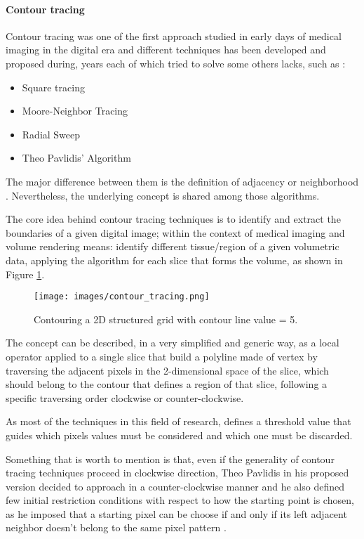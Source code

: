 \documentclass[12pt,a4paper]{extarticle}
\newcommand{\linespace}{\vspace{8pt}}
\begin{document}
\paragraph{Contour tracing}
Contour tracing was one of the first approach studied in early days of medical imaging in the digital era and different techniques has been developed and proposed during, years each of which tried to solve some others lacks, such as :
\begin{itemize}
\item Square tracing \cite{contour}
\item Moore-Neighbor Tracing \cite{contour}
\item Radial Sweep \cite{contour}
\item Theo Pavlidis' Algorithm \cite{Pavlidis1982}
\end{itemize}
The major difference between them is the definition of adjacency or neighborhood \cite{Ghuneim2007Mar}. Nevertheless, the underlying concept is shared among those algorithms.
\linespace

The core idea behind contour tracing techniques is to identify and extract the boundaries of a given digital image; within the context of medical imaging and volume rendering means: identify different tissue/region of a given volumetric data, applying the algorithm for each slice that forms the volume, as shown in Figure \ref{fig:contouring2d}. 

\begin{figure}[hbtp]
\centering
\texttt{[image: images/contour\_tracing.png]}
\caption{Contouring a 2D structured grid with contour line value = 5.}
\label{fig:contouring2d}
\end{figure}


The concept can be described, in a very simplified and generic way, as a local operator %
applied to a single slice that build a polyline made of vertex by traversing the adjacent pixels in the 2-dimensional space of the slice, which should belong to the contour that defines a region of that slice, following a specific traversing order clockwise or counter-clockwise. 

As most of the techniques in this field of research, defines a threshold value that guides which pixels values must be considered and which one must be discarded.

Something that is worth to mention is that, even if the generality of contour tracing techniques proceed in clockwise direction, Theo Pavlidis in his proposed version decided to approach in a counter-clockwise manner and he also defined few initial restriction conditions with respect to how the starting point is chosen, as he imposed that a starting pixel can be choose if and only if its left adjacent neighbor doesn't belong to the same pixel pattern \cite{Ghuneim2007Mar}.
\linespace
\end{document}
